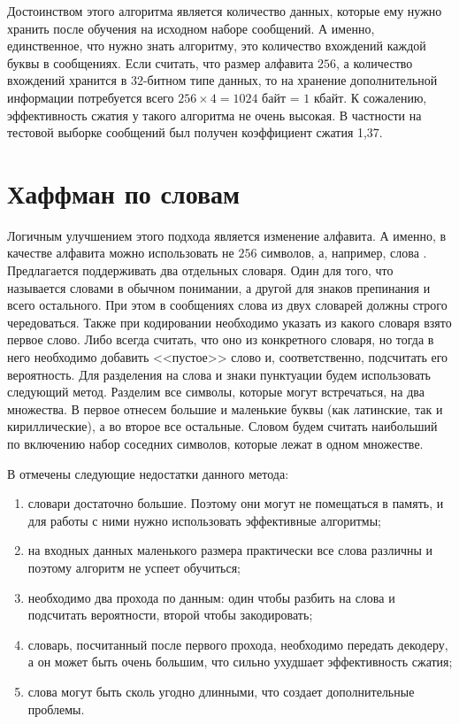 Достоинством этого алгоритма является количество данных, которые ему нужно хранить после обучения 
на исходном наборе сообщений. А именно, единственное, что нужно знать алгоритму, это количество 
вхождений каждой буквы в сообщениях. Если считать, что размер алфавита $256$, а количество вхождений
 хранится в $32$-битном типе данных, то на хранение дополнительной информации потребуется всего $256\times 4 = 1024$ байт = $1$ кбайт.
К сожалению, эффективность сжатия у такого алгоритма не очень высокая. В частности на тестовой 
выборке сообщений был получен коэффициент сжатия 1,37.
 
\section{Хаффман по словам} 
Логичным улучшением этого подхода является изменение алфавита. А именно, в качестве алфавита
 можно использовать не $256$ символов, а, например, слова \cite{handbook}. 
 Предлагается поддерживать два отдельных словаря. Один для того, что называется словами в обычном
  понимании, а другой для знаков препинания и всего остального. При этом в сообщениях слова из
   двух словарей должны строго чередоваться. Также при кодировании необходимо указать из какого 
   словаря взято первое слово. Либо всегда считать, что оно из конкретного словаря, но тогда в 
   него необходимо добавить <<пустое>> слово и, соответственно, подсчитать его вероятность. 
Для разделения на слова и знаки пунктуации будем использовать следующий метод. Разделим все символы, 
которые могут встречаться, на два множества. В первое отнесем большие и маленькие буквы
 (как латинские, так и кириллические), а во второе все остальные. Словом будем считать наибольший 
 по включению набор соседних символов, которые лежат в одном множестве. 

В \cite{handbook} отмечены следующие недостатки данного метода:
\begin{enumerate}
	\item словари достаточно большие. Поэтому они могут не помещаться в память, и для работы с ними нужно 
использовать эффективные алгоритмы;
	\item на входных данных маленького размера практически все слова различны и поэтому алгоритм не успеет 
обучиться;
	\item необходимо два прохода по данным: один чтобы разбить на слова и подсчитать вероятности, второй 
чтобы закодировать;
	\item словарь, посчитанный после первого прохода, необходимо передать декодеру, а он может быть очень 
большим, что сильно ухудшает эффективность сжатия;
	\item слова могут быть сколь угодно длинными, что создает дополнительные проблемы.
\end{enumerate}

